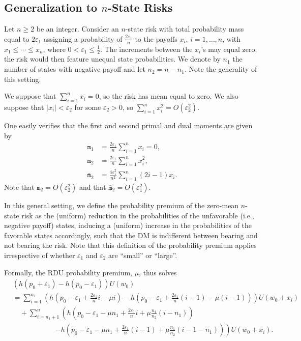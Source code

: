 \documentclass[11pt]{article}
\begin{document}
\begin{appendices}
\setcounter{equation}{0}

\section{Generalization to $n$-State Risks
}\label{sec:nonbinary}

Let $n\geq 2$ be an integer.
Consider an $n$-state risk with total probability mass equal to $2\varepsilon_{1}$
assigning a probability of $\tfrac{2\varepsilon_{1}}{n}$ to the payoffs $x_{i}$, $i=1,\ldots,n$,
with $x_{1}\leq\cdots\leq x_{n}$,
where $0<\varepsilon_{1}\leq\tfrac{1}{2}$.
The increments between the $x_{i}$'s may equal zero;
the 
risk would then feature unequal state probabilities.
We denote by $n_{1}$ the number of states with negative payoff and let $n_{2}=n-n_{1}$.
Note the generality of this setting.

We suppose that $\sum_{i=1}^{n}x_{i}=0$, so the risk has mean equal to zero.
We also suppose that $|x_{i}|<\varepsilon_{2}$ for some $\varepsilon_{2}>0$, so $\sum_{i=1}^{n} x_{i}^{2}=O(\varepsilon_{2}^{2})$.

One easily verifies that the first and second primal and dual moments
are given by
\begin{align}
\texttt{m}_{1}&=\frac{2\varepsilon_{1}}{n}\sum_{i=1}^{n}x_{i}=0,\label{eq:firstprimaldual}\\
\texttt{m}_{2}&=\frac{2\varepsilon_{1}}{n}\sum_{i=1}^{n}x_{i}^{2},\label{eq:secondprimal}\\
\bar{\texttt{m}}_{2}&=\frac{4\varepsilon_{1}^{2}}{n^{2}}\sum_{i=1}^{n}(2i-1)x_{i}.\label{eq:seconddual}
\end{align}
Note that $\texttt{m}_{2}=O(\varepsilon_{2}^{2})$
and that $\bar{\texttt{m}}_{2}=O(\varepsilon_{1}^{2})$.

In this general setting, we define the probability premium of the zero-mean $n$-state risk
as the (uniform) reduction in the probabilities of the unfavorable (i.e., negative payoff) states,
inducing a (uniform) increase in the probabilities of the favorable states accordingly,
such that the DM is indifferent between bearing and not bearing the risk.
Note that this definition of the probability premium applies
irrespective of whether $\varepsilon_{1}$ and $\varepsilon_{2}$ are ``small'' or ``large''.

Formally, the RDU probability premium, $\mu$, thus solves
\begin{align*}
&
\left(h(p_{0}+\varepsilon_{1})-h(p_{0}-\varepsilon_{1})\right)U\left(w_{0}\right)
\\
&=
\sum_{i=1}^{n_{1}}\left(h\left(p_{0}-\varepsilon_{1}+\frac{2\varepsilon_{1}}{n}i-\mu i\right)
-h\left(p_{0}-\varepsilon_{1}+\frac{2\varepsilon_{1}}{n}(i-1)-\mu(i-1)\right)\right)U\left(w_{0}+x_{i}\right)\\
&\quad
+\sum_{i=n_{1}+1}^{n}\left(h\left(p_{0}-\varepsilon_{1}-\mu n_{1}+\frac{2\varepsilon_{1}}{n}i+\mu\frac{n_{1}}{n_{2}}(i-n_{1})\right)\right.\\
&\qquad\qquad\qquad
\left.-h\left(p_{0}-\varepsilon_{1}-\mu n_{1}+\frac{2\varepsilon_{1}}{n}(i-1)+\mu\frac{n_{1}}{n_{2}}(i-1-n_{1})\right)\right)U\left(w_{0}+x_{i}\right).
\end{align*}


\end{appendices}
\end{document}
